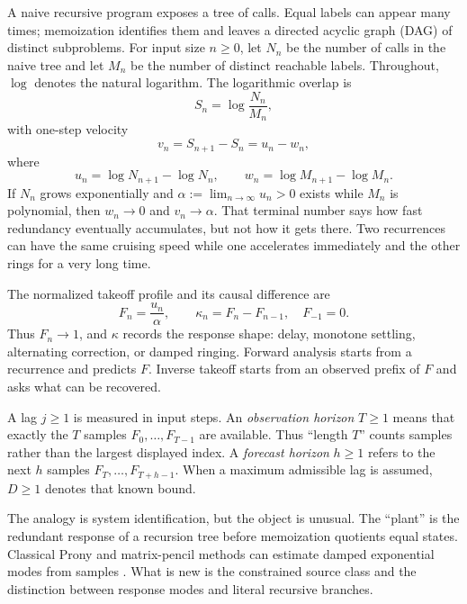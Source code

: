 \documentclass[10pt,twocolumn]{article}
\theoremstyle{cleanprop}
\begin{document}
A naive recursive program exposes a tree of calls. Equal labels can appear
many times; memoization identifies them and leaves a directed acyclic graph
(DAG) of distinct subproblems. For input size $n\ge0$, let $N_n$ be the number
of calls in the naive tree and let $M_n$ be the number of distinct reachable
labels. Throughout, $\log$ denotes the natural logarithm. The logarithmic
overlap is
\[
S_n=\log\frac{N_n}{M_n},
\]
with one-step velocity
\[
v_n=S_{n+1}-S_n=u_n-w_n,
\]
where
\[
u_n=\log N_{n+1}-\log N_n,\qquad
w_n=\log M_{n+1}-\log M_n.
\]
If $N_n$ grows exponentially and
$\alpha:=\lim_{n\to\infty}u_n>0$ exists while $M_n$ is polynomial, then
$w_n\to0$ and $v_n\to\alpha$. That terminal
number says how fast redundancy eventually accumulates, but not how it gets
there. Two recurrences can have the same cruising speed while one accelerates
immediately and the other rings for a very long time.

The normalized takeoff profile and its causal difference are
\[
F_n=\frac{u_n}{\alpha},\qquad
\kappa_n=F_n-F_{n-1},\quad F_{-1}=0.
\]
Thus $F_n\to1$, and $\kappa$ records the response shape: delay, monotone
settling, alternating correction, or damped ringing. Forward analysis starts
from a recurrence and predicts $F$. Inverse takeoff starts from an observed
prefix of $F$ and asks what can be recovered.

A lag $j\ge1$ is measured in input steps. An \emph{observation horizon}
$T\ge1$ means that exactly the $T$ samples $F_0,\ldots,F_{T-1}$ are available.
Thus ``length $T$'' counts samples rather than the largest displayed index. A
\emph{forecast horizon} $h\ge1$ refers to the next $h$ samples
$F_T,\ldots,F_{T+h-1}$. When a maximum admissible lag is assumed, $D\ge1$
denotes that known bound.

The analogy is system identification, but the object is unusual. The
``plant'' is the redundant response of a recursion tree before memoization
quotients equal states. Classical Prony and matrix-pencil methods can estimate
damped exponential modes from samples \cite{prony,hua,plonka}. What is new is
the constrained source class and the distinction between response modes and
literal recursive branches.
\end{document}
